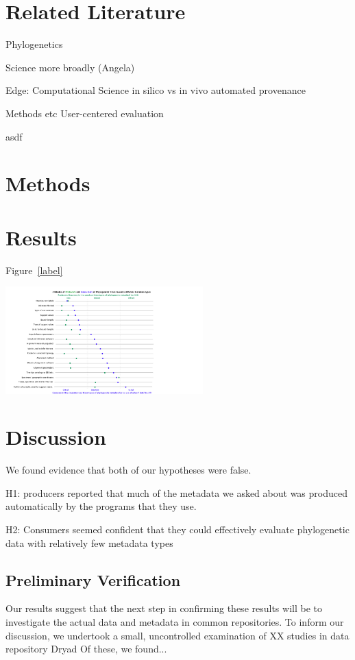 \documentclass[12pt]{scrartcl}
\newenvironment{Figure}
  {\par\medskip\noindent\minipage{\linewidth}}
  {\endminipage\par\medskip}
\begin{document}
\section{Related Literature}

Phylogenetics

Science more broadly (Angela)

Edge: Computational Science
in silico vs in vivo
automated provenance

Methods etc
User-centered evaluation

\begin{compactitem}
  \item asdf
\end{compactitem}

\section{Methods}

\section{Results}
Figure~\ref{label}
\begin{Figure}
	\includegraphics[width=3in]{rasters/OTOL graph - wide.png}
	\label{label}
\end{Figure}

\section{Discussion}
We found evidence that both of our hypotheses were false. 

H1: producers reported that much of the metadata we asked about was produced automatically by the programs that they use.

H2: Consumers seemed confident that they could effectively evaluate phylogenetic data with relatively few metadata types

\subsection{Preliminary Verification}
Our results suggest that the next step in confirming these results will be to investigate the actual data and metadata in common repositories.  To inform our discussion, we undertook a small, uncontrolled examination of XX%
studies in data repository Dryad %
Of these, we found... %
\end{document}
